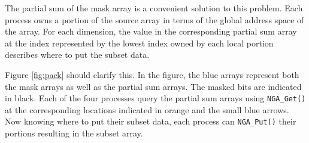 The partial sum of the mask array is a convenient solution to this problem.
Each process owns a portion of the source array in terms of the global address
space of the array.  For each dimension, the value in the corresponding
partial sum array at the index represented by the lowest index owned by each
local portion describes where to put the subset data.

Figure \ref{fig:pack} should clarify this.  In the figure, the blue arrays
represent both the mask arrays as well as the partial sum arrays.  The masked
bits are indicated in black.  Each of the four processes query the partial sum
arrays using \verb=NGA_Get()= at the corresponding locations indicated in
orange and the small blue arrows.  Now knowing where to put their subset data,
each process can \verb=NGA_Put()= their portions resulting in the subset
array.
